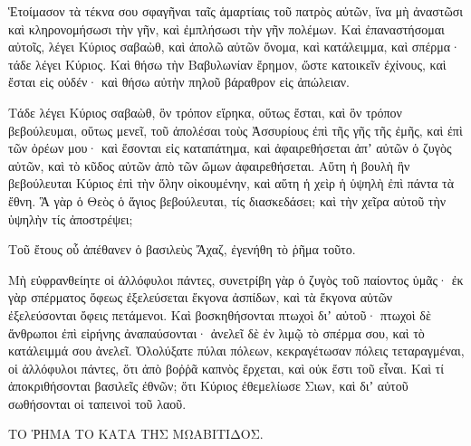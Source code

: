 {Ἑτοίμασον τὰ τέκνα σου σφαγῆναι ταῖς ἁμαρτίαις τοῦ πατρὸς αὐτῶν, ἵνα μὴ ἀναστῶσι καὶ κληρονομήσωσι τὴν γῆν, καὶ ἐμπλήσωσι τὴν γῆν πολέμων.
Καὶ ἐπαναστήσομαι αὐτοῖς, λέγει Κύριος σαβαὼθ, καὶ ἀπολῶ αὐτῶν ὄνομα, καὶ κατάλειμμα, καὶ σπέρμα· τάδε λέγει Κύριος.
Καὶ θήσω τὴν Βαβυλωνίαν ἔρημον, ὥστε κατοικεῖν ἐχίνους, καὶ ἔσται εἰς οὐδέν· καὶ θήσω αὐτὴν πηλοῦ βάραθρον εἰς ἀπώλειαν.
\par }{\PP {}Τάδε λέγει Κύριος σαβαὼθ, ὃν τρόπον εἴρηκα, οὕτως ἔσται, καὶ ὃν τρόπον βεβούλευμαι, οὕτως μενεῖ,
τοῦ ἀπολέσαι τοὺς Ἀσσυρίους ἐπὶ τῆς γῆς τῆς ἐμῆς, καὶ ἐπὶ τῶν ὀρέων μου· καὶ ἔσονται εἰς καταπάτημα, καὶ ἀφαιρεθήσεται ἀπʼ αὐτῶν ὁ ζυγὸς αὐτῶν, καὶ τὸ κῦδος αὐτῶν ἀπὸ τῶν ὤμων ἀφαιρεθήσεται.
Αὕτη ἡ βουλὴ ἣν βεβούλευται Κύριος ἐπὶ τὴν ὅλην οἰκουμένην, καὶ αὕτη ἡ χεὶρ ἡ ὑψηλὴ ἐπὶ πάντα τὰ ἔθνη.
Ἃ γὰρ ὁ Θεὸς ὁ ἅγιος βεβούλευται, τίς διασκεδάσει; καὶ τὴν χεῖρα αὐτοῦ τὴν ὑψηλὴν τίς ἀποστρέψει;
\par }{\PP {}Τοῦ ἔτους οὗ ἀπέθανεν ὁ βασιλεὺς Ἄχαζ, ἐγενήθη τὸ ῥῆμα τοῦτο.
\par }{\PP {}Μὴ εὐφρανθείητε οἱ ἀλλόφυλοι πάντες, συνετρίβη γὰρ ὁ ζυγὸς τοῦ παίοντος ὑμᾶς· ἐκ γὰρ σπέρματος ὄφεως ἐξελεύσεται ἔκγονα ἀσπίδων, καὶ τὰ ἔκγονα αὐτῶν ἐξελεύσονται ὄφεις πετάμενοι.
Καὶ βοσκηθήσονται πτωχοὶ διʼ αὐτοῦ· πτωχοὶ δὲ ἄνθρωποι ἐπὶ εἰρήνης ἀναπαύσονται· ἀνελεῖ δὲ ἐν λιμῷ τὸ σπέρμα σου, καὶ τὸ κατάλειμμά σου ἀνελεῖ.
Ὀλολύξατε πύλαι πόλεων, κεκραγέτωσαν πόλεις τεταραγμέναι, οἱ ἀλλόφυλοι πάντες, ὅτι ἀπὸ βοῤῥᾶ καπνὸς ἔρχεται, καὶ οὐκ ἔστι τοῦ εἶναι.
Καὶ τί ἀποκριθήσονται βασιλεῖς ἐθνῶν; ὅτι Κύριος ἐθεμελίωσε Σιων, καὶ διʼ αὐτοῦ σωθήσονται οἱ ταπεινοὶ τοῦ λαοῦ.
\par }{\PP ΤΟ ῬΗΜΑ ΤΟ ΚΑΤΑ ΤΗΣ ΜΩΑΒΙΤΙΔΟΣ.

\par }
